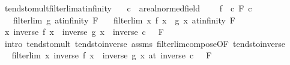 \begin{isabellebody}
\ tendsto{\isacharunderscore}{\kern0pt}mult{\isacharunderscore}{\kern0pt}filterlim{\isacharunderscore}{\kern0pt}at{\isacharunderscore}{\kern0pt}infinity{\isacharcolon}{\kern0pt}\isanewline
\ \ \ c\ {\isacharcolon}{\kern0pt}{\isacharcolon}{\kern0pt}\ {\isachardoublequoteopen}{\isacharprime}{\kern0pt}a{\isacharcolon}{\kern0pt}{\isacharcolon}{\kern0pt}real{\isacharunderscore}{\kern0pt}normed{\isacharunderscore}{\kern0pt}field{\isachardoublequoteclose}\isanewline
\ \ \ \ {\isachardoublequoteopen}{\isacharparenleft}{\kern0pt}f\ {\isasymlonglongrightarrow}\ c{\isacharparenright}{\kern0pt}\ F{\isachardoublequoteclose}\ {\isachardoublequoteopen}c\ {\isasymnoteq}\ {}{\isachardoublequoteclose}\isanewline
\ \ \ {\isachardoublequoteopen}filterlim\ g\ at{\isacharunderscore}{\kern0pt}infinity\ F{\isachardoublequoteclose}\isanewline
\ \ \ {\isachardoublequoteopen}filterlim\ {\isacharparenleft}{\kern0pt}{\isasymlambda}x{\isachardot}{\kern0pt}\ f\ x\ {\isacharasterisk}{\kern0pt}\ g\ x{\isacharparenright}{\kern0pt}\ at{\isacharunderscore}{\kern0pt}infinity\ F{\isachardoublequoteclose}\isanewline
%
\isadelimproof
%
\endisadelimproof
%
\isatagproof
{}\isamarkupfalse%
\ {\isacharminus}{\kern0pt}\isanewline
\ \ \isamarkupfalse%
\ {\isachardoublequoteopen}{\isacharparenleft}{\kern0pt}{\isacharparenleft}{\kern0pt}{\isasymlambda}x{\isachardot}{\kern0pt}\ inverse\ {\isacharparenleft}{\kern0pt}f\ x{\isacharparenright}{\kern0pt}\ {\isacharasterisk}{\kern0pt}\ inverse\ {\isacharparenleft}{\kern0pt}g\ x{\isacharparenright}{\kern0pt}{\isacharparenright}{\kern0pt}\ {\isasymlonglongrightarrow}\ inverse\ c\ {\isacharasterisk}{\kern0pt}\ {}{\isacharparenright}{\kern0pt}\ F{\isachardoublequoteclose}\isanewline
\ \ \ \ \isamarkupfalse%
\ {\isacharparenleft}{\kern0pt}intro\ tendsto{\isacharunderscore}{\kern0pt}mult\ tendsto{\isacharunderscore}{\kern0pt}inverse\ assms\ filterlim{\isacharunderscore}{\kern0pt}compose{\isacharbrackleft}{\kern0pt}OF\ tendsto{\isacharunderscore}{\kern0pt}inverse{\isacharunderscore}{\kern0pt}{}{\isacharbrackright}{\kern0pt}{\isacharparenright}{\kern0pt}\isanewline
\ \ \isamarkupfalse%
\ \isamarkupfalse%
\ {\isachardoublequoteopen}filterlim\ {\isacharparenleft}{\kern0pt}{\isasymlambda}x{\isachardot}{\kern0pt}\ inverse\ {\isacharparenleft}{\kern0pt}f\ x{\isacharparenright}{\kern0pt}\ {\isacharasterisk}{\kern0pt}\ inverse\ {\isacharparenleft}{\kern0pt}g\ x{\isacharparenright}{\kern0pt}{\isacharparenright}{\kern0pt}\ {\isacharparenleft}{\kern0pt}at\ {\isacharparenleft}{\kern0pt}inverse\ c\ {\isacharasterisk}{\kern0pt}\ {}{\isacharparenright}{\kern0pt}{\isacharparenright}{\kern0pt}\ F{\isachardoublequoteclose}\isanewline

\end{isabellebody}
